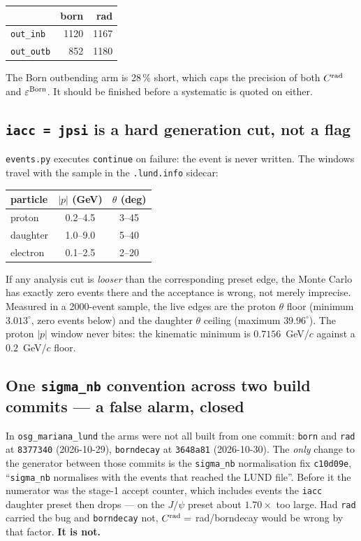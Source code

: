 \documentclass[11pt]{article}
\newcommand{\crad}{C^{\rm rad}}
\begin{document}
\begin{center}
\begin{tabular}{lrr}
\toprule
 & born & rad \\
\midrule
\texttt{out\_inb}  & 1120 & 1167 \\
\texttt{out\_outb} &  852 & 1180 \\
\bottomrule
\end{tabular}
\end{center}
The Born outbending arm is 28\,\% short, which caps the precision of both $\crad$ and
$\varepsilon^{\rm Born}$. It should be finished before a systematic is quoted on either.

\subsection{\texttt{iacc = jpsi} is a hard generation cut, not a flag}

\texttt{events.py} executes \texttt{continue} on failure: the event is never written. The windows
travel with the sample in the \texttt{.lund.info} sidecar:
\begin{center}
\begin{tabular}{lcc}
\toprule
particle & $|p|$ (GeV) & $\theta$ (deg) \\
\midrule
proton   & 0.2--4.5 & 3--45 \\
daughter & 1.0--9.0 & 5--40 \\
electron & 0.1--2.5 & 2--20 \\
\bottomrule
\end{tabular}
\end{center}
If any analysis cut is \emph{looser} than the corresponding preset edge, the Monte Carlo has exactly
zero events there and the acceptance is wrong, not merely imprecise. Measured in a 2000-event
sample, the live edges are the proton $\theta$ floor (minimum $3.013^\circ$, zero events below) and
the daughter $\theta$ ceiling (maximum $39.96^\circ$). The proton $|p|$ window never bites: the
kinematic minimum is $0.7156$~GeV/$c$ against a $0.2$~GeV/$c$ floor.

\subsection{One \texttt{sigma\_nb} convention across two build commits --- a false alarm, closed}

In \texttt{osg\_mariana\_lund} the arms were not all built from one commit:
\texttt{born} and \texttt{rad} at \texttt{8377340} (2026-10-29), \texttt{borndecay} at
\texttt{3648a81} (2026-10-30). The \emph{only} change to the generator between those commits is the
\texttt{sigma\_nb} normalisation fix \texttt{c10d09e}, ``\texttt{sigma\_nb} normalises with the events
that reached the LUND file''. Before it the numerator was the stage-1 accept counter, which includes
events the \texttt{iacc} daughter preset then drops --- on the $J/\psi$ preset about $1.70\times$ too
large. Had \texttt{rad} carried the bug and \texttt{borndecay} not, $\crad=$
rad/borndecay would be wrong by that factor. \textbf{It is not.}
\end{document}
